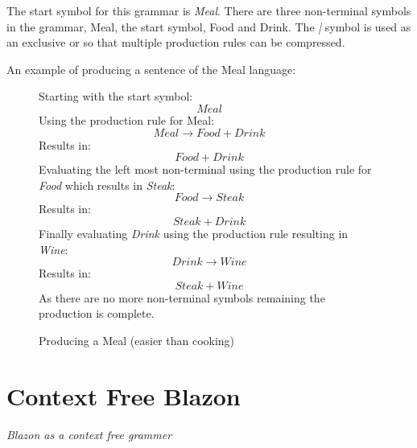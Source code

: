 The start symbol for this grammar is \emph{Meal}. There are three non-terminal symbols in the grammar, Meal, the start symbol, Food and Drink.   The \emph{|} symbol is used as an exclusive or so that multiple production rules can be compressed. 

An example of producing a sentence of the Meal language:

\begin{figure}[H]

Starting with the start symbol:
\[Meal\] 
Using the production rule for Meal:
\[ Meal \to Food + Drink \]
Results in:
\[Food + Drink\]
Evaluating the left most non-terminal using the production rule for \emph{Food} which results in \emph{Steak}:
\[ Food \to Steak \]
Results in:
\[Steak + Drink\]
Finally evaluating \emph{Drink} using the production rule resulting in \emph{Wine}:
\[ Drink \to  Wine\]
Results in:
\[ Steak + Wine\]
As there are no more non-terminal symbols remaining the production is complete.

\caption{Producing a Meal (easier than cooking)}
\end{figure}


\section{Context Free Blazon}

\emph{Blazon as a context free grammer}

